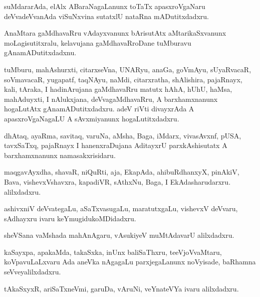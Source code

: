 \documentclass{article}
\begin{document}
\begin{mn}
suMdararAda,  elAlx  ABaraNagaLanunx  toTaTx  apasxroVgaNaru  deVvadeVvanAda  
viSuNxvina  sutatxlU  nataRna  mADutitxdadxru.
\end{mn}

\begin{mn}
AnaMtara  gaMdhavaRru  vAdayxvanunx  bArisutAtx  aMtarikaSxvanunx  moLagisutitxralu,  
kelavujana  gaMdhavaRroDane  tuMburavu  gAnamADutitxdadxnu.
\end{mn}

\begin{mn}
tuMburu,  mahAshurxti,  citarxseVna,  UNARyu,  anaGa,  goVmAyu,  sUyaRvacaR,  soVmavacaR,  
yugapatf,  taqNAyu,  naMdi,  citarxratha,  shAlishira,  pajaRnayx,  kali,  tAraka,  
I hadinArujana  gaMdhavaRru  matutx  hAhA,  hUhU,  haMsa,  mahAduyxti,  I  nAlukxjana,  
deVvagaMdhavaRru,  A  barxhamxnanunx  hogaLutAtx  gAnamADutitxdadxru.  adeV riVti  
divayxrAda  A  apasxroVgaNagaLU  A sAvxmiyanunx  hogaLutitxdadxru.  
\end{mn}

\begin{mn}
dhAtaq,  ayaRma,  savitaq,  varuNa,  aMsha,  Baga,  iMdarx,  vivasAvxnf,  pUSA,  tavxSaTxq,  
pajaRnayx  I  hanenxraDujana AditayxrU  parxkAshisutatx  A barxhamxnanunx  namasakxrisidaru.
\end{mn}

\begin{mn}
maqgavAyxdha,  shavaR,  niQuRti,  aja,  EkapAda,  ahibuRdhanxyX,  pinAkiV,  Bava,  
vishevxVshavxra,  kapadiVR,  sAthxNu,  Baga,  I  EkAdasharudarxru.  alilxdadxru.
\end{mn}

\begin{mn}
ashivxniV  deVvategaLu,  aSaTxvasugaLu,  maratutxgaLu,  vishevxV  deVvaru,  
sAdhayxru ivaru  keYmugidukoMDidadxru.
\end{mn}

\begin{mn}
sheVSana  vaMshada  mahAnAgaru,  vAsukiyeV  muMtAdavarU  alilxdadxru.
\end{mn}

\begin{mn}
kaSayxpa,  apakaMda, takaSxka,  inUnx  baliSaThxru,  teeVjoVvaMtaru, koVpavuLaLxvaru  
Ada  aneVka  nAgagaLu  parxjegaLanunx  noVyisade,  baRhamna  seVveyalilxdadxru.
\end{mn}

\begin{mn}
tAkaSxyxR,  ariSaTxneVmi,  garuDa,  vAruNi,  veYnateVYa  ivaru  alilxdadxru. 
\end{mn}
\end{document}
